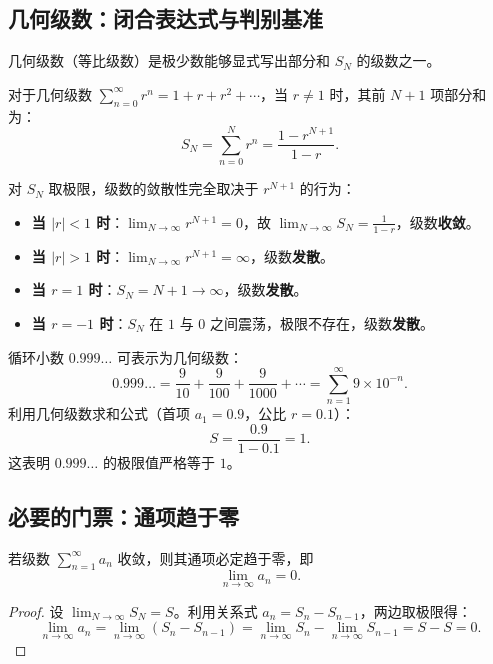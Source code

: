 \subsection{几何级数：闭合表达式与判别基准}

几何级数（等比级数）是极少数能够显式写出部分和 \(S_N\) 的级数之一。

对于几何级数 \(\sum_{n=0}^{\infty} r^n = 1 + r + r^2 + \cdots\)，当 \(r \neq 1\) 时，其前 \(N+1\) 项部分和为：
\[
S_N = \sum_{n=0}^{N} r^n = \frac{1 - r^{N+1}}{1 - r}.
\]

对 \(S_N\) 取极限，级数的敛散性完全取决于 \(r^{N+1}\) 的行为：
\begin{itemize}
    \item \textbf{当 \(|r| < 1\) 时}：\(\lim_{N \to \infty} r^{N+1} = 0\)，故 \(\lim_{N \to \infty} S_N = \frac{1}{1 - r}\)，级数\textbf{收敛}。
    \item \textbf{当 \(|r| > 1\) 时}：\(\lim_{N \to \infty} r^{N+1} = \infty\)，级数\textbf{发散}。
    \item \textbf{当 \(r = 1\) 时}：\(S_N = N + 1 \to \infty\)，级数\textbf{发散}。
    \item \textbf{当 \(r = -1\) 时}：\(S_N\) 在 \(1\) 与 \(0\) 之间震荡，极限不存在，级数\textbf{发散}。
\end{itemize}

\begin{example}
循环小数 \(0.999\dots\) 可表示为几何级数：
\[
0.999\dots = \frac{9}{10} + \frac{9}{100} + \frac{9}{1000} + \cdots = \sum_{n=1}^{\infty} 9 \times 10^{-n}.
\]
利用几何级数求和公式（首项 \(a_1 = 0.9\)，公比 \(r = 0.1\)）：
\[
S = \frac{0.9}{1 - 0.1} = 1.
\]
这表明 \(0.999\dots\) 的极限值严格等于 \(1\)。
\end{example}

\subsection{必要的门票：通项趋于零}

\begin{theorem}[收敛的必要条件]
若级数 \(\sum_{n=1}^{\infty} a_n\) 收敛，则其通项必定趋于零，即
\[
\lim_{n \to \infty} a_n = 0.
\]
\end{theorem}

\begin{proof}
设 \(\lim_{N \to \infty} S_N = S\)。利用关系式 \(a_n = S_n - S_{n-1}\)，两边取极限得：
\[
\lim_{n \to \infty} a_n = \lim_{n \to \infty} (S_n - S_{n-1}) = \lim_{n \to \infty} S_n - \lim_{n \to \infty} S_{n-1} = S - S = 0.
\]
\end{proof}

